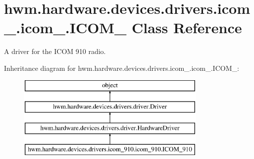 \hypertarget{classhwm_1_1hardware_1_1devices_1_1drivers_1_1icom__910_1_1icom__910_1_1_i_c_o_m__910}{\section{hwm.\-hardware.\-devices.\-drivers.\-icom\-\_.\-icom\-\_.\-I\-C\-O\-M\-\_ Class Reference}
\label{classhwm_1_1hardware_1_1devices_1_1drivers_1_1icom__910_1_1icom__910_1_1_i_c_o_m__910}
}


A driver for the I\-C\-O\-M 910 radio.  


Inheritance diagram for hwm.\-hardware.\-devices.\-drivers.\-icom\-\_.\-icom\-\_.\-I\-C\-O\-M\-\_\-:\begin{figure}[H]
\begin{center}
\leavevmode
\includegraphics[height=4.000000cm]{classhwm_1_1hardware_1_1devices_1_1drivers_1_1icom__910_1_1icom__910_1_1_i_c_o_m__910}
\end{center}
\end{figure}
